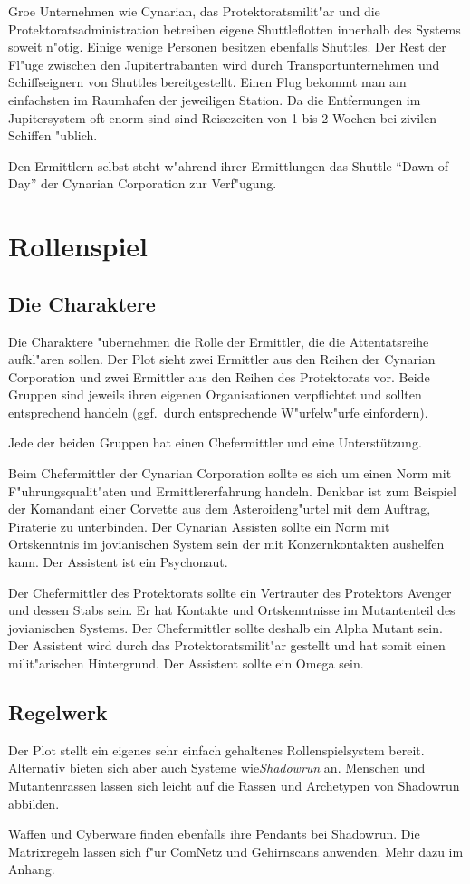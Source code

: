 Gro\3e Unternehmen wie Cynarian, das Protektoratsmilit"ar und die Protektoratsadministration betreiben eigene Shuttleflotten innerhalb des Systems soweit n"otig. Einige wenige Personen besitzen ebenfalls Shuttles. Der Rest der Fl"uge zwischen den Jupitertrabanten wird durch Transportunternehmen und Schiffseignern von Shuttles bereitgestellt. Einen Flug bekommt man am einfachsten im Raumhafen der jeweiligen Station. Da die Entfernungen im Jupitersystem oft enorm sind sind Reisezeiten von 1 bis 2 Wochen bei zivilen Schiffen "ublich.

Den Ermittlern selbst steht w"ahrend ihrer Ermittlungen das Shuttle "`Dawn of Day"' der Cynarian Corporation zur Verf"ugung.

\section{Rollenspiel}

\subsection{Die Charaktere}

Die Charaktere "ubernehmen die Rolle der Ermittler, die die Attentatsreihe aufkl"aren sollen. Der Plot sieht zwei Ermittler aus den Reihen der Cynarian Corporation und zwei Ermittler aus den Reihen des Protektorats vor. Beide Gruppen sind jeweils ihren eigenen Organisationen verpflichtet und sollten entsprechend handeln (ggf.~durch entsprechende W"urfelw"urfe einfordern).

Jede der beiden Gruppen hat einen Chefermittler und eine Unterstützung.

Beim Chefermittler der Cynarian Corporation sollte es sich um einen Norm  mit F"uhrungsqualit"aten und Ermittlererfahrung handeln. Denkbar ist zum Beispiel der Komandant einer Corvette aus dem Asteroideng"urtel mit dem Auftrag, Piraterie zu unterbinden. Der Cynarian Assisten sollte ein Norm mit Ortskenntnis im jovianischen System sein der mit Konzernkontakten aushelfen kann. Der Assistent ist ein Psychonaut. 

Der Chefermittler des Protektorats sollte ein Vertrauter des Protektors Avenger und dessen Stabs sein. Er hat Kontakte und Ortskenntnisse im Mutantenteil des jovianischen Systems. Der Chefermittler sollte deshalb ein Alpha Mutant sein. Der Assistent wird durch das Protektoratsmilit"ar gestellt und hat somit einen milit"arischen Hintergrund. Der Assistent sollte ein Omega sein.

\subsection{Regelwerk}

Der Plot stellt ein eigenes sehr einfach gehaltenes Rollenspielsystem bereit. Alternativ bieten sich aber auch Systeme wie\emph{Shadowrun} an. Menschen und Mutantenrassen lassen sich leicht auf die Rassen und Archetypen von Shadowrun abbilden. 

Waffen und Cyberware finden ebenfalls ihre Pendants bei Shadowrun. Die Matrixregeln lassen sich f"ur ComNetz und Gehirnscans anwenden. Mehr dazu im Anhang.